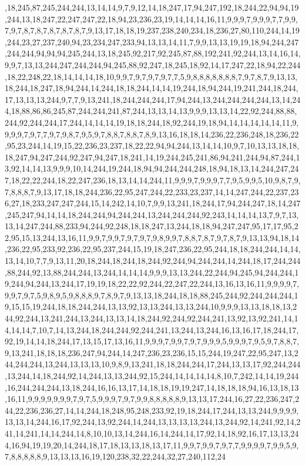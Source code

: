 ,18,245,87,245,244,244,13,14,14,9,7,9,12,14,18,247,17,94,247,192,18,244,22,94,94,19,244,13,18,247,22,247,247,22,18,94,23,236,23,19,14,14,14,16,11,9,9,9,7,9,9,9,7,7,9,9,7,9,7,8,7,8,7,8,7,8,7,8,7,9,13,17,18,18,19,237,238,240,234,18,236,27,80,110,244,14,19,244,23,27,237,240,94,23,234,247,233,94,13,13,14,11,7,9,9,13,13,19,19,18,94,244,247,244,244,94,94,94,245,244,13,18,245,92,217,92,245,87,88,192,241,92,244,13,14,16,14,9,9,7,13,13,244,247,244,244,94,245,88,92,247,18,245,18,92,14,17,247,22,18,94,22,244,18,22,248,22,18,14,14,14,18,10,9,9,7,9,7,9,7,9,7,7,5,9,8,8,8,8,8,8,8,7,9,7,8,7,9,13,13,18,244,18,247,18,94,244,14,244,18,18,244,14,14,19,244,18,94,244,19,241,244,18,244,17,13,13,13,244,9,7,7,9,13,241,18,244,244,244,17,94,244,13,244,244,244,244,13,14,244,18,88,86,86,245,87,244,244,241,87,244,13,13,14,13,9,9,9,13,13,14,22,92,244,88,88,244,92,244,244,17,244,14,14,14,19,18,18,244,18,92,244,19,18,94,14,14,14,14,14,11,9,9,9,9,7,9,7,7,9,7,9,8,7,9,5,9,7,8,8,7,8,8,7,8,9,13,16,18,18,14,236,22,236,248,18,236,22,95,23,244,14,19,15,22,236,23,237,18,22,22,94,94,244,13,14,14,10,9,7,10,13,13,18,18,18,247,94,247,244,92,247,94,247,18,241,14,19,244,245,241,86,94,241,244,94,87,244,13,92,14,14,13,9,9,9,10,14,244,19,244,18,94,94,244,244,248,18,94,18,13,14,244,247,247,18,22,22,244,18,22,247,236,18,13,14,14,244,11,9,9,9,7,9,9,9,7,7,9,5,9,9,5,10,9,8,7,9,7,8,8,8,7,9,13,17,18,18,244,236,22,95,247,244,22,233,23,237,14,14,247,244,22,237,236,27,18,233,247,247,244,15,14,242,14,10,7,9,9,13,241,18,244,17,94,244,247,18,14,247,245,247,94,14,14,18,244,244,94,244,244,13,244,244,244,92,243,14,14,14,13,7,9,7,13,13,14,247,244,88,233,94,244,92,248,18,18,247,13,244,18,18,94,247,247,95,17,17,95,22,95,15,13,244,13,16,11,9,9,7,9,9,7,9,7,9,7,9,8,9,9,7,8,8,7,8,7,9,7,8,7,9,13,13,94,18,14,236,22,95,233,92,236,22,95,237,244,15,19,18,247,236,22,95,244,18,18,244,244,14,14,13,14,10,7,7,9,13,11,20,18,244,18,244,18,244,92,244,94,244,244,14,244,18,17,244,244,88,244,92,13,88,244,244,13,244,14,14,14,9,9,9,13,13,244,22,244,94,245,94,244,244,19,244,94,244,13,244,17,19,19,18,22,22,92,244,22,247,22,244,13,16,13,16,11,9,9,9,9,7,9,9,7,9,7,5,9,8,9,5,9,8,8,8,9,7,8,9,7,9,13,13,18,244,18,18,88,245,244,92,244,244,244,19,15,15,19,244,18,18,244,244,13,13,92,13,13,244,13,13,244,10,9,9,9,13,13,18,18,13,244,92,244,13,241,244,13,244,13,13,14,18,244,92,244,92,244,241,13,92,13,92,241,14,14,14,14,7,10,7,14,13,244,18,244,244,92,244,241,13,244,13,244,16,13,16,17,18,244,17,92,19,14,14,18,244,17,13,15,17,13,16,11,9,9,9,7,9,9,7,9,7,9,9,9,5,9,9,9,7,9,5,9,7,8,8,7,9,13,241,18,18,18,236,247,94,244,14,247,236,23,236,15,15,244,19,247,22,95,247,13,244,244,244,13,244,13,13,13,10,9,8,9,13,241,18,18,244,244,17,244,13,13,17,92,244,244,13,244,14,18,244,92,14,244,13,13,244,92,15,244,14,14,14,14,8,10,7,242,14,14,19,244,16,244,244,244,13,18,244,16,16,13,17,14,18,18,19,19,247,14,18,18,18,94,16,13,18,13,16,11,9,9,9,9,9,9,9,7,9,7,5,9,9,9,7,9,7,9,9,8,8,8,8,8,9,13,13,17,244,16,27,22,236,247,244,22,236,236,27,14,14,244,18,248,95,248,233,92,19,18,244,17,244,13,13,244,9,9,9,9,13,13,14,244,16,17,92,244,13,92,244,14,244,13,13,13,13,244,13,244,92,14,241,92,14,241,14,241,14,14,244,14,8,10,10,13,14,244,16,14,244,14,17,92,14,18,92,16,17,13,13,244,16,94,19,19,20,14,244,18,17,18,13,13,18,13,17,11,9,9,7,9,9,7,9,7,7,9,9,9,9,7,9,9,5,9,7,8,8,8,8,8,9,13,13,13,16,19,120,238,32,22,244,32,27,240,112,24